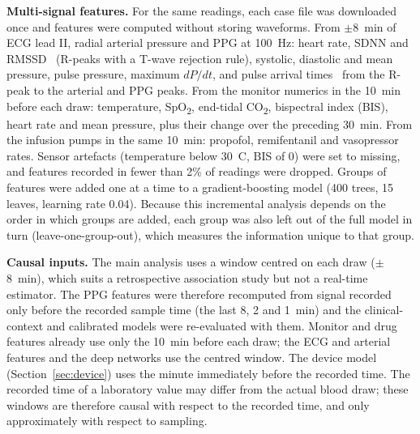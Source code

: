 \documentclass[11pt]{article}
\begin{document}
\textbf{Multi-signal features.} For the same readings, each case file was downloaded once and features were computed without storing waveforms. From $\pm$8~min of ECG lead II, radial arterial pressure and PPG at 100~Hz: heart rate, SDNN and RMSSD~\citep{taskforce1996} (R-peaks with a T-wave rejection rule), systolic, diastolic and mean pressure, pulse pressure, maximum $dP/dt$, and pulse arrival times~\citep{mukkamala2015} from the R-peak to the arterial and PPG peaks. From the monitor numerics in the 10~min before each draw: temperature, SpO\textsubscript{2}, end-tidal CO\textsubscript{2}, bispectral index (BIS), heart rate and mean pressure, plus their change over the preceding 30~min. From the infusion pumps in the same 10~min: propofol, remifentanil and vasopressor rates. Sensor artefacts (temperature below 30~\textdegree C, BIS of 0) were set to missing, and features recorded in fewer than 2\% of readings were dropped. Groups of features were added one at a time to a gradient-boosting model (400 trees, 15 leaves, learning rate 0.04). Because this incremental analysis depends on the order in which groups are added, each group was also left out of the full model in turn (leave-one-group-out), which measures the information unique to that group.

\textbf{Causal inputs.} The main analysis uses a window centred on each draw ($\pm$8~min), which suits a retrospective association study but not a real-time estimator. The PPG features were therefore recomputed from signal recorded only before the recorded sample time (the last 8, 2 and 1~min) and the clinical-context and calibrated models were re-evaluated with them. Monitor and drug features already use only the 10~min before each draw; the ECG and arterial features and the deep networks use the centred window. The device model (Section~\ref{sec:device}) uses the minute immediately before the recorded time. The recorded time of a laboratory value may differ from the actual blood draw; these windows are therefore causal with respect to the recorded time, and only approximately with respect to sampling.
\end{document}
